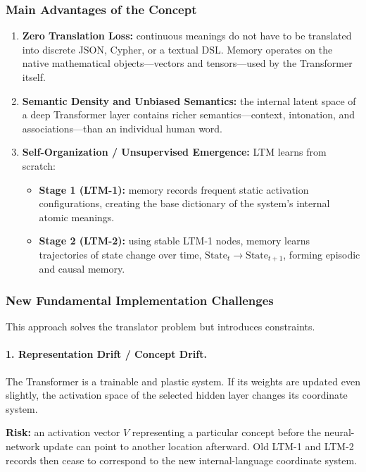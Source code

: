 \documentclass[11pt,a4paper]{article}
\begin{document}
\subsubsection*{Main Advantages of the Concept}
\begin{enumerate}
\item \textbf{Zero Translation Loss:} continuous meanings do not have to be translated into discrete JSON, Cypher, or a textual DSL. Memory operates on the native mathematical objects---vectors and tensors---used by the Transformer itself.
\item \textbf{Semantic Density and Unbiased Semantics:} the internal latent space of a deep Transformer layer contains richer semantics---context, intonation, and associations---than an individual human word.
\item \textbf{Self-Organization / Unsupervised Emergence:} LTM learns from scratch:
\begin{itemize}
\item \textbf{Stage 1 (LTM-1):} memory records frequent static activation configurations, creating the base dictionary of the system's internal atomic meanings.
\item \textbf{Stage 2 (LTM-2):} using stable LTM-1 nodes, memory learns trajectories of state change over time, $\mathrm{State}_t\rightarrow\mathrm{State}_{t+1}$, forming episodic and causal memory.
\end{itemize}
\end{enumerate}

\subsubsection*{New Fundamental Implementation Challenges}
This approach solves the translator problem but introduces constraints.

\paragraph{1. Representation Drift / Concept Drift.}
The Transformer is a trainable and plastic system. If its weights are updated even slightly, the activation space of the selected hidden layer changes its coordinate system.

\textbf{Risk:} an activation vector $V$ representing a particular concept before the neural-network update can point to another location afterward. Old LTM-1 and LTM-2 records then cease to correspond to the new internal-language coordinate system.
\end{document}
